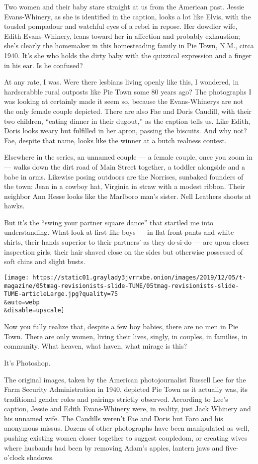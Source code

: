 Two women and their baby stare straight at us from the American past.
Jessie Evans-Whinery, as she is identified in the caption, looks a lot
like Elvis, with the tousled pompadour and watchful eyes of a rebel in
repose. Her dowdier wife, Edith Evans-Whinery, leans toward her in
affection and probably exhaustion; she's clearly the homemaker in this
homesteading family in Pie Town, N.M., circa 1940. It's she who holds
the dirty baby with the quizzical expression and a finger in his ear. Is
he confused?

At any rate, I was. Were there lesbians living openly like this, I
wondered, in hardscrabble rural outposts like Pie Town some 80 years
ago? The photographs I was looking at certainly made it seem so, because
the Evans-Whinerys are not the only female couple depicted. There are
also Fae and Doris Caudill, with their two children, ``eating dinner in
their dugout,'' as the caption tells us. Like Edith, Doris looks weary
but fulfilled in her apron, passing the biscuits. And why not? Fae,
despite that name, looks like the winner at a butch realness contest.

Elsewhere in the series, an unnamed couple --- a female couple, once you
zoom in --- walks down the dirt road of Main Street together, a toddler
alongside and a babe in arms. Likewise posing outdoors are the Norrises,
sunbaked founders of the town: Jean in a cowboy hat, Virginia in straw
with a modest ribbon. Their neighbor Ann Hesse looks like the Marlboro
man's sister. Nell Leathers shoots at hawks.

But it's the ``swing your partner square dance'' that startled me into
understanding. What look at first like boys --- in flat-front pants and
white shirts, their hands superior to their partners' as they do-si-do
--- are upon closer inspection girls, their hair shaved close on the
sides but otherwise possessed of soft chins and slight busts.

\texttt{[image: https://static01.graylady3jvrrxbe.onion/images/2019/12/05/t-magazine/05tmag-revisionists-slide-TUME/05tmag-revisionists-slide-TUME-articleLarge.jpg?quality=75\\\&auto=webp\\\&disable=upscale]}

Now you fully realize that, despite a few boy babies, there are no men
in Pie Town. There are only women, living their lives, singly, in
couples, in families, in community. What heaven, what haven, what mirage
is this?

It's Photoshop.

The original images, taken by the American photojournalist Russell Lee
for the Farm Security Administration in 1940, depicted Pie Town as it
actually was, its traditional gender roles and pairings strictly
observed. According to Lee's caption, Jessie and Edith Evans-Whinery
were, in reality, just Jack Whinery and his unnamed wife. The Caudills
weren't Fae and Doris but Faro and his anonymous missus. Dozens of other
photographs have been manipulated as well, pushing existing women closer
together to suggest coupledom, or creating wives where husbands had been
by removing Adam's apples, lantern jaws and five-o'clock shadows.

